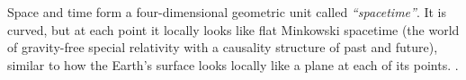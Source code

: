 {Space and time form a four-dimensional geometric
unit called \emph{“spacetime”}. It is curved, but
at each point it locally looks like
flat Minkowski spacetime (the world of gravity-free special 
relativity with a causality structure of past and future), similar to how the Earth's surface looks locally like a plane at each 
of its points.}
%
%
%
\cite[273]{Born-2001}.


